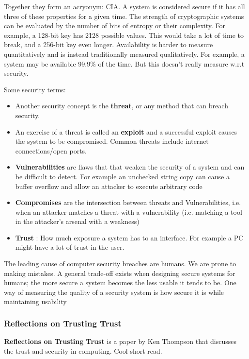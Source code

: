 \documentclass[../notes.tex]{subfiles}
\begin{document}
Together they form an acryonym: CIA. A system is considered secure if it has all three of these properties for a given time.
The strength of cryptographic systems can be evaluated by the number of bits of entropy or their complexity. For example, a 128-bit key has 2\^128 possible values. This would take a lot of time to break, and a 256-bit key even longer.
Availability is harder to measure quantitatively and is instead traditionally measured qualitatively. For example, a system may be available 99.9\% of the time. But this doesn't really measure w.r.t security.


Some security terms:
\begin{itemize}
    \item Another security concept is the \textbf{threat}, or any method that can breach security.
    \item An exercise of a threat is called an \textbf{exploit}  and a successful exploit causes the system to be compromised. Common threats include internet connections/open ports.
    \item \textbf{Vulnerabilities}  are flaws that that weaken the security of a system and can be difficult to detect. For example an unchecked string copy can cause a buffer overflow and allow an attacker to execute arbitrary code
    \item \textbf{Compromises} are the intersection between threats and Vulnerabilities, i.e. when an attacker matches a threat with a vulnerability (i.e. matching a tool in the attacker's arsenal with a weakness)
    \item \textbf{Trust} : How much exposure a system has to an interface. For example a PC might have a lot of trust in the user.
\end{itemize}

The leading cause of computer security breaches are humans. We are prone to making mistakes.
A general trade-off exists when designing secure systems for humans; the more secure a system becomes the less usable it  tends to be. One way of measuring the quality of a security system is how secure it is while maintaining usability

\subsubsection{Reflections on Trusting Trust}

\begin{blockquote}
    \textbf{Reflections on Trusting Trust} is a paper by Ken Thompson that discusses the trust and security in computing. Cool short read.
\end{blockquote}
\end{document}
